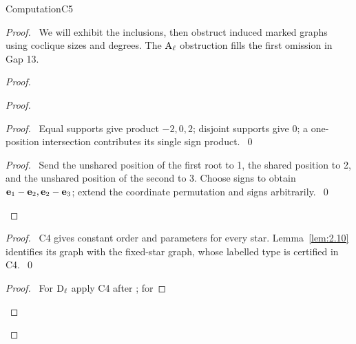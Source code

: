 \begin{namedresult}{Computation}{C5}\label{comp:C5}
\end{namedresult}
\begin{proof}
 \pfsketch\ We will exhibit the inclusions, then obstruct induced marked graphs
 using coclique sizes and degrees. The $\mathrm{A}_\ell$ obstruction fills the first omission in Gap 13.
 \begin{proof}
  \begin{proof}
   \begin{proof}\pf\ Equal supports give product $-2,0,2$; disjoint supports give
    0; a one-position intersection contributes its single sign product.~\qed\end{proof}
   \qedstep
   \begin{proof}\pf\ Send the unshared position of the first root to 1, the shared
    position to 2, and the unshared position of the second to 3. Choose signs
    to obtain ${\mathbf e}_1-{\mathbf e}_2,{\mathbf e}_2-{\mathbf e}_3$; extend the coordinate permutation and signs arbitrarily.~\qed\end{proof}
  \end{proof}
  \begin{proof}\pf\ C4 gives constant order and parameters for every star.
   Lemma~\ref{lem:2.10} identifies its graph with the fixed-star graph, whose
   labelled type is certified in C4.~\qed\end{proof}
  \qedstep
  \begin{proof}\pf\ For $\mathrm{D}_\ell$ apply C4 after ; for

\end{proof}
\end{proof}
\end{proof}
